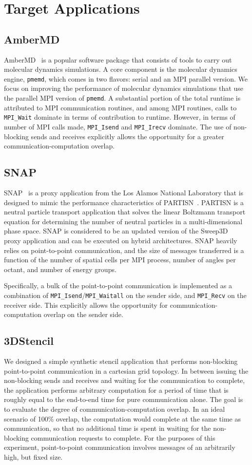 \section{Target Applications}
  \subsection{AmberMD}

  AmberMD~\cite{AmberMD} is a popular software package that consists of tools to carry out molecular dynamics simulations. A core component is the molecular dynamics engine, \verb+pmemd+, which comes in two flavors: serial and an MPI parallel version. We focus on improving the performance of molecular dynamics simulations that use the parallel MPI version of \verb+pmemd+. A substantial portion of the total runtime is attributed to MPI communication routines, and among MPI routines, calls to \verb+MPI_Wait+ dominate in terms of contribution to runtime. However, in terms of number of MPI calls made, \verb+MPI_Isend+ and \verb+MPI_Irecv+ dominate. The use of non-blocking sends and receives explicitly allows the opportunity for a greater communication-computation overlap.
  \subsection{SNAP}
  SNAP~\cite{SNAP} is a proxy application from the Los Alamos National Laboratory that is designed to mimic the performance characteristics of PARTISN~\cite{PARTISN}. PARTISN is a neutral particle transport application that solves the linear Boltzmann transport equation for determining the number of neutral particles in a multi-dimensional phase space. SNAP is considered to be an updated version of the Sweep3D~\cite{Sweep3D} proxy application and can be executed on hybrid architectures. SNAP heavily relies on point-to-point communication, and the size of messages transferred is a function of the number of spatial cells per MPI process, number of angles per octant, and number of energy groups. \par
  Specifically, a bulk of the point-to-point communication is implemented as a combination of \verb+MPI_Isend+/\verb+MPI_Waitall+ on the sender side, and \verb+MPI_Recv+ on the receiver side. This explicitly allows the opportunity for communication-computation overlap on the sender side. 
  \subsection{3DStencil}
  We designed a simple synthetic stencil application that performs non-blocking point-to-point communication in a cartesian grid topology. In between issuing the non-blocking sends and receives and waiting for the communication to complete, the application performs arbitrary computation for a period of time that is roughly equal to the end-to-end time for pure communication alone. The goal is to evaluate the degree of communication-computation overlap. In an ideal scenario of 100\% overlap, the computation would complete at the same time as communication, so that no additional time is spent in waiting for the non-blocking communication requests to complete. For the purposes of this experiment, point-to-point communication involves messages of an arbitrarily high, but fixed size. 
